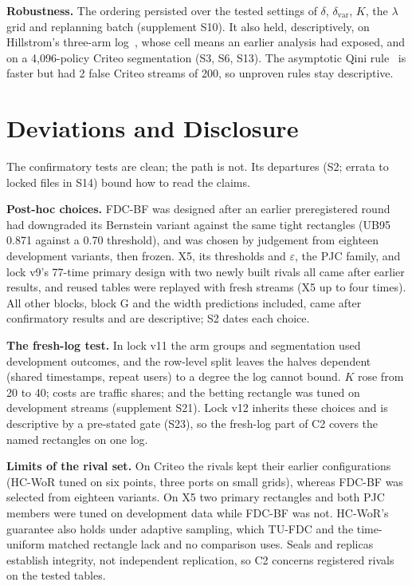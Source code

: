 \documentclass[sigconf,anonymous,review]{acmart}
\newcommand{\eps}{\varepsilon}
\newcommand{\dvar}{\delta_{\text{var}}}
\begin{document}
\textbf{Robustness.} The ordering persisted over the tested settings of $\delta$, $\dvar$, $K$, the $\lambda$ grid and replanning batch (supplement S10). It also held, descriptively, on Hillstrom's three-arm log~\citep{hillstrom2008minethatdata}, whose cell means an earlier analysis had exposed, and on a 4,096-policy Criteo segmentation (S3, S6, S13). The asymptotic Qini rule~\citep{sverdrup2023qini} is faster but had 2 false Criteo streams of 200, so unproven rules stay descriptive.

\section{Deviations and Disclosure}\label{sec:deviations}

The confirmatory tests are clean; the path is not. Its departures (S2; errata to locked files in S14) bound how to read the claims.

\textbf{Post-hoc choices.} FDC-BF was designed after an earlier preregistered round had downgraded its Bernstein variant against the same tight rectangles (UB95 0.871 against a 0.70 threshold), and was chosen by judgement from eighteen development variants, then frozen. X5, its thresholds and $\eps$, the PJC family, and lock v9's 77-time primary design with two newly built rivals all came after earlier results, and reused tables were replayed with fresh streams (X5 up to four times). All other blocks, block G and the width predictions included, came after confirmatory results and are descriptive; S2 dates each choice.

\textbf{The fresh-log test.} In lock v11 the arm groups and segmentation used development outcomes, and the row-level split leaves the halves dependent (shared timestamps, repeat users) to a degree the log cannot bound. $K$ rose from 20 to 40; costs are traffic shares; and the betting rectangle was tuned on development streams (supplement S21). Lock v12 inherits these choices and is descriptive by a pre-stated gate (S23), so the fresh-log part of C2 covers the named rectangles on one log.

\textbf{Limits of the rival set.} On Criteo the rivals kept their earlier configurations (HC-WoR tuned on six points, three ports on small grids), whereas FDC-BF was selected from eighteen variants. On X5 two primary rectangles and both PJC members were tuned on development data while FDC-BF was not. HC-WoR's guarantee also holds under adaptive sampling, which TU-FDC and the time-uniform matched rectangle lack and no comparison uses. Seals and replicas establish integrity, not independent replication, so C2 concerns registered rivals on the tested tables.
\end{document}
